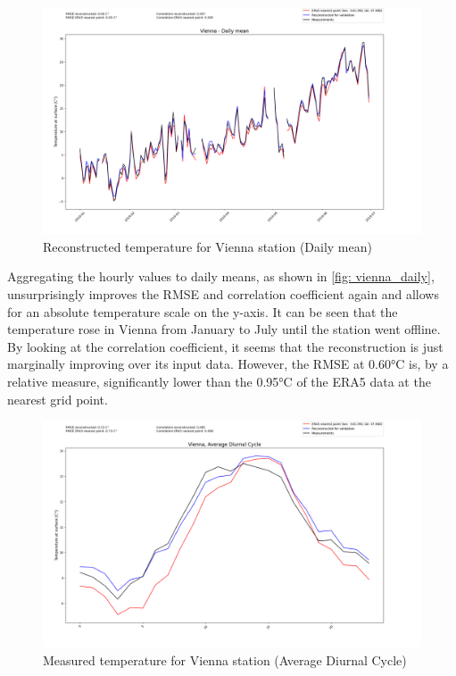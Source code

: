 \begin{figure}
\centering
\includegraphics[width=1.00\textwidth]{resources/images/charts/vienna_eval_grib_final/Vienna - Daily mean.png}
\caption{Reconstructed temperature for Vienna station (Daily mean)}
\label{fig: vienna_daily}
\end{figure}

Aggregating the hourly values to daily means, as shown in \autoref{fig: vienna_daily}, unsurprisingly improves the RMSE and correlation coefficient again and allows for an absolute temperature scale on the y-axis.
It can be seen that the temperature rose in Vienna from January to July until the station went offline.
By looking at the correlation coefficient, it seems that the reconstruction is just marginally improving over its input data.
However, the RMSE at 0.60°C is, by a relative measure, significantly lower than the 0.95°C of the ERA5 data at the nearest grid point. 

\begin{figure}
\centering
\includegraphics[width=1.00\textwidth]{resources/images/charts/vienna_eval_grib_final/Vienna, Average Diurnal Cycle.png}
\caption{Measured temperature for Vienna station (Average Diurnal Cycle)}
\label{fig: vienna_diurnal}
\end{figure}

